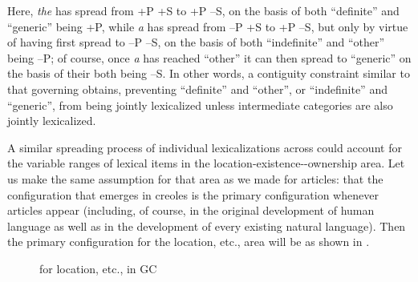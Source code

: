 Here, \textit{the} has spread from +P +S to +P --S, on the basis of both ``defi\-nite'' and ``generic'' being +P, while \textit{a} has spread from --P +S to +P --S, but only by virtue of having first spread to --P --S, on the basis of both ``indefinite'' and ``other'' being --P; of course, once \textit{a} has reached ``other'' it can then spread to ``generic'' on the basis of their both being --S. In other words, a contiguity constraint similar to that governing  obtains, preventing ``definite'' and ``other'', or ``indefinite'' and ``generic'', from being jointly lexicalized unless\enlargethispage{1\baselineskip} intermediate categories are also jointly lexicalized.

A similar spreading process of individual lexicalizations across  could account for the variable ranges of lexical items
in the location-existence--ownership area. Let us make the same assumption for that area as we made for articles: that the configuration that emerges in creoles is the primary configuration whenever articles appear (including, of course, in the original development of human language as well as in the development of every existing natural language). Then the primary configuration for the location, etc., area will be as shown in . %

\begin{figure}[h]
	\begin{center}
	\end{center}
	\caption{ for location, etc., in GC}\label{fig:4.5}
\end{figure}

